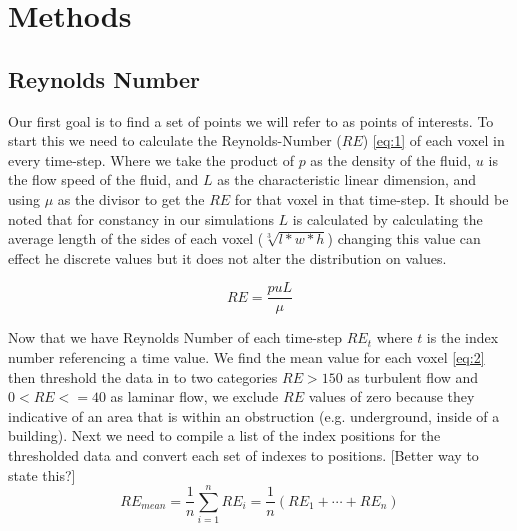 
\chapter{Methods} %

\label{Chapter2} %


\section{Reynolds Number}

Our first goal is to find a set of points we will refer to as points of interests. To start this we need to calculate the Reynolds-Number (\ensuremath{RE}) \ref{eq:1} of each voxel in every time-step.
Where we take the product of  \ensuremath{p} as the density of the fluid, \ensuremath{u} is the flow speed of the fluid, and \ensuremath{L} as the characteristic linear dimension, and using $\mu$ as the divisor to get the \ensuremath{RE} for that voxel in that time-step. It should be noted that for constancy in our simulations \ensuremath{L} is calculated by calculating the average length of the sides of each voxel  (\ensuremath{\sqrt[3]{l*w*h}}) changing this value can effect he discrete values but it does not alter the distribution on values. 

\begin{equation}\label{eq:1}
RE  = \frac{puL} {\mu} 
\end{equation}

Now that we have Reynolds Number of each time-step \ensuremath{RE_t} where \ensuremath{t} is the index number referencing a time value.  We find the mean value for each voxel \ref{eq:2} then threshold the data in to two categories \ensuremath{RE>150} as turbulent flow and \ensuremath{0<RE<=40}  as laminar flow, we exclude \ensuremath{RE} values of zero because they indicative of an area that is within an obstruction (e.g. underground, inside of a building). Next we need to compile a list of the index positions for the thresholded data and convert each set of indexes to positions. \color{red} [Better way to state this?] \color{black} 
\begin{equation} \label{eq:2}
RE_{mean} = \frac{1}{n} \sum_{i=1}^{n} RE_{i}=\frac{1}{n}\left(RE_{1}+\cdots+RE_{n}\right)
\end{equation} 

